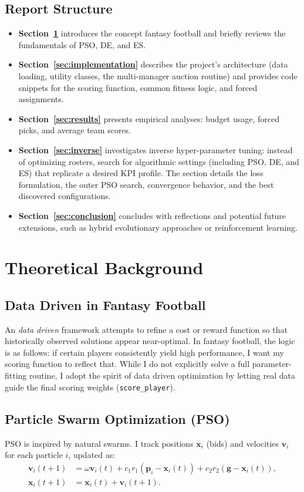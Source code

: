 \documentclass[sigconf]{acmart}
\begin{document}
	\subsection{Report Structure}
	\begin{itemize}
		\item \textbf{Section~\ref{sec:theory}} introduces the concept fantasy football and briefly reviews the fundamentals of PSO, DE, and ES.
		\item \textbf{Section~\ref{sec:implementation}} describes the project’s architecture (data loading, utility classes, the multi-manager auction routine) and provides code snippets for the scoring function, common fitness logic, and forced assignments.
		\item \textbf{Section~\ref{sec:results}} presents empirical analyses: budget usage, forced picks, and average team scores.
		\item \textbf{Section~\ref{sec:inverse}} investigates inverse hyper-parameter tuning: instead of optimizing rosters, search for algorithmic settings (including PSO, DE, and ES) that replicate a desired KPI profile. The section details the loss formulation, the outer PSO search, convergence behavior, and the best discovered configurations.
		\item \textbf{Section~\ref{sec:conclusion}} concludes with reflections and potential future extensions, such as hybrid evolutionary approaches or reinforcement learning.
	\end{itemize}
	
	\section{Theoretical Background}
	\label{sec:theory}
	
	\subsection{Data Driven in Fantasy Football}
	An \emph{data driven} framework attempts to refine a cost or reward function so that historically observed solutions appear near-optimal. In fantasy football, the logic is as follows: if certain players consistently yield high performance, I want my scoring function to reflect that. While I do not explicitly solve a full parameter-fitting routine, I adopt the spirit of data driven optimization by letting real data guide the final scoring weights (\texttt{score\_player}).
	
	\subsection{Particle Swarm Optimization (PSO)}
	PSO is inspired by natural swarms. I track positions $\mathbf{x}_i$ (bids) and velocities $\mathbf{v}_i$ for each particle $i$, updated as:
	\begin{align*}
		\mathbf{v}_i(t+1) &= \omega \mathbf{v}_i(t)
		+ c_1 r_1 (\mathbf{p}_i - \mathbf{x}_i(t))
		+ c_2 r_2 (\mathbf{g} - \mathbf{x}_i(t)), \\
		\mathbf{x}_i(t+1) &= \mathbf{x}_i(t) + \mathbf{v}_i(t+1).
	\end{align*}
	
\end{document}
